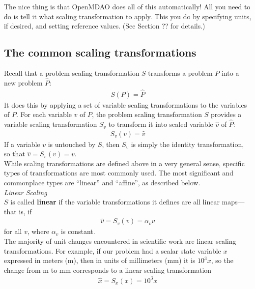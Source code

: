 \documentclass{article}
\begin{document}
\noindent
The nice thing is that OpenMDAO does all of this automatically! All you need to do is tell it what scaling transformation to apply. This you do by specifying units, if desired, and setting reference values. (See Section ?? for details.)

\subsection*{The common scaling transformations}

Recall that a problem scaling transformation $S$ transforms a problem $P$ into a new problem $\hat{P}$:
\begin{align*}
    S(P) = \hat{P}
\end{align*}
It does this by applying a set of variable scaling transformations to the variables of $P$. For each variable $v$ of $P$, the problem scaling transformation $S$ provides a variable scaling transformation $S_v$ to transform it into scaled variable $\hat{v}$ of $\hat{P}$:
\begin{align*}
    S_v(v) = \hat{v}
\end{align*}
If a variable $v$ is untouched by $S$, then $S_v$ is simply the identity transformation, so that $\hat{v} = S_v(v) = v$. \\

\noindent
While scaling transformations are defined above in a very general sense, specific types of transformations are most commonly used. The most significant and commonplace types are ``linear'' and ``affine'', as described below. \\

\noindent \textit{Linear Scaling} \\

\noindent
$S$ is called \textbf{linear} if the variable transformations it defines are all linear maps---that is, if
\begin{align*}
    \hat{v} = S_v(v) = \alpha_v v
\end{align*}
for all $v$, where $\alpha_v$ is constant. \\

\noindent
The majority of unit changes encountered in scientific work are linear scaling transformations. For example, if our problem had a scalar state variable $x$ expressed in meters (m), then in units of millimeters (mm) it is $10^3x$, so the change from m to mm corresponds to a linear scaling transformation
\begin{align*}
    \hat{x} = S_x(x) = 10^3x
\end{align*}
\end{document}
